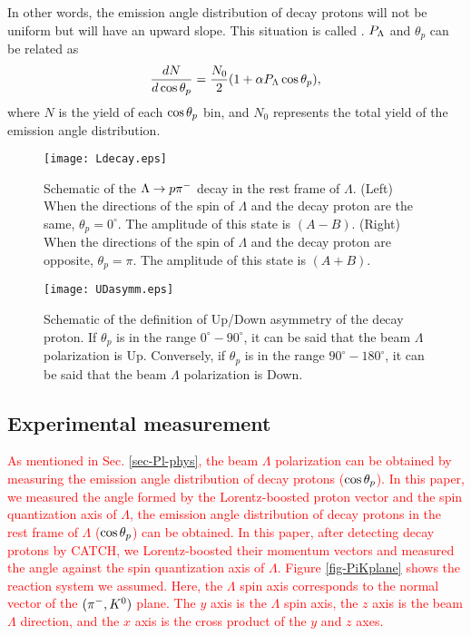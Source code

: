 In other words, the emission angle distribution of decay protons will not be uniform but will have an upward slope. This situation is called . $P_{\Lambda}$ and $\theta_{p}$ can be related as 
\begin{equation}
  \frac{dN}{d\cos{\theta_p}} = \frac{N_0}{2}(1+\alpha P_{\Lambda}\cos{\theta_p}), 
  \label{eq-costp}
\end{equation}
where $N$ is the yield of each $\cos{\theta_p}$ bin, and $N_0$ represents the total yield of the emission angle distribution. %

\begin{figure}[h]
  \centering
  \texttt{[image: Ldecay.eps]}
  \caption{Schematic of the $\Lambda\to p\pi^{-}$ decay in the rest frame of $\Lambda$. (Left) When the directions of the spin of $\Lambda$ and the decay proton are the same, $\theta_{p}=0^{\circ}$. The amplitude of this state is $(A-B)$. (Right) When the directions of the spin of $\Lambda$ and the decay proton are opposite, $\theta_{p}=\pi$. The amplitude of this state is $(A+B)$.}
  \label{fig-Ldecay}
\end{figure}

\begin{figure}[h]
  \centering
  \texttt{[image: UDasymm.eps]}
  \caption{Schematic of the definition of Up/Down asymmetry of the decay proton. If $\theta_{p}$ is in the range $0^{\circ}-90^{\circ}$, it can be said that the beam $\Lambda$ polarization is Up. Conversely, if $\theta_{p}$ is in the range $90^{\circ}-180^{\circ}$, it can be said that the beam $\Lambda$ polarization is Down.}
  \label{fig-UDasymm}
\end{figure}


\subsection{Experimental measurement}

\textcolor{red}{ As mentioned in Sec. \ref{sec-Pl-phys}, the beam $\Lambda$ polarization can be obtained by measuring the emission angle distribution of decay protons ($\cos{\theta_p}$). In this paper, we measured the angle formed by the Lorentz-boosted proton vector and the spin quantization axis of $\Lambda$, the emission angle distribution of decay protons in the rest frame of $\Lambda$ ($\cos{\theta_p}$) can be obtained. In this paper, after detecting decay protons by CATCH, we Lorentz-boosted their momentum vectors and measured the angle against the spin quantization axis of $\Lambda$. Figure \ref{fig-PiKplane} shows the reaction system we assumed. Here, the $\Lambda$ spin axis corresponds to the normal vector of the $(\pi^-,K^0)$ plane. The $y$ axis is the $\Lambda$ spin axis, the $z$ axis is the beam $\Lambda$ direction, and the $x$ axis is the cross product of the $y$ and $z$ axes. }


